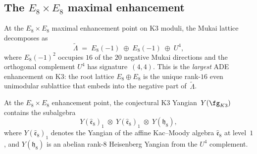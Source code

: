 
\subsection{The \texorpdfstring{$E_8 \times E_8$}{E-8 x E-8} maximal enhancement}
\label{subsec:k3-e8e8-maximal}

At the $E_8 \times E_8$ maximal enhancement point on K3 moduli, the Mukai lattice decomposes as
\begin{equation}\label{eq:k3-e8e8-decomposition}
 \widetilde{\Lambda}
 \;=\;
 E_8(-1) \;\oplus\; E_8(-1) \;\oplus\; U^4,
\end{equation}
where $E_8(-1)^2$ occupies $16$ of the $20$ negative Mukai directions and the orthogonal complement $U^4$ has signature~$(4,4)$. This is the \emph{largest} ADE enhancement on K3: the root lattice $E_8 \oplus E_8$ is the unique rank-$16$ even unimodular sublattice that embeds into the negative part of~$\widetilde{\Lambda}$.

\begin{conjecture}
\label{conj:k3-e8e8-yangian}
\ClaimStatusConjectured
At the $E_8 \times E_8$ enhancement point, the conjectural K3 Yangian~$Y(\fg_{K3})$ contains the subalgebra
\[
 Y(\widehat{\mathfrak{e}}_8)_1
 \;\otimes\;
 Y(\widehat{\mathfrak{e}}_8)_1
 \;\otimes\;
 Y(\mathfrak{h}_8),
\]
where $Y(\widehat{\mathfrak{e}}_8)_1$ denotes the Yangian of the affine Kac--Moody algebra $\widehat{\mathfrak{e}}_8$ at level~$1$, and $Y(\mathfrak{h}_8)$ is an abelian rank-$8$ Heisenberg Yangian from the $U^4$ complement.
\end{conjecture}

